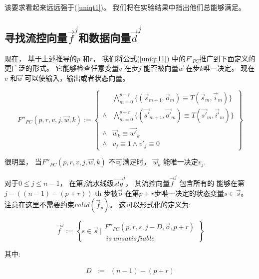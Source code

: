该要求看起来远远强于(\ref{uniqt1})。
我们将在实验结果中指出他们总能够满足。



\subsection{寻找流控向量$\vec{f}^j$和数据向量$\vec{d}^j$}\label{subsec_inferstage}

现在，
基于上述推导的$p$ 和$r$，
我们将公式(\ref{uniqt11}) 中的$F'_{PC}$推广到下面定义的更广泛的形式。
它能够检查任意变量$v$ 在步$j$
能否被向量$\vec{w}$ 在步$k$唯一决定。
现在$v$ 和$\vec{w}$ 可以使输入，输出或者状态向量。

\begin{equation}\label{uniqt2}
F''_{PC}(p,r,v,j,\vec{w},k):=
\left\{
\begin{array}{cc}
&\bigwedge_{m=0}^{p+r}
\{
(\vec{s}_{m+1},\vec{o}_m)\equiv T(\vec{s}_m,\vec{i}_m)
\}
\\
\wedge&\bigwedge_{m=0}^{p+r}
\{
(\vec{s'}_{m+1},\vec{o'}_m)\equiv T(\vec{s'}_m,\vec{i'}_m)
\}
\\
\wedge&\vec{w}_{k}\equiv \vec{w'}_{k} \\
\wedge& v_{j}\equiv 1 \wedge  v'_{j}\equiv 0
\end{array}
\right\}
\end{equation}

很明显，
当$F''_{PC}(p,r,v,j,\vec{w},k)$ 不可满足时，
$\vec{w}_k$ 能唯一决定$v_j$.

对于$0\le j\le n-1$，
在第$j$流水线级$\vec{stg}^j$，
其流控向量$\vec{f}^j$ 包含所有的
能够在第$j-((n-1)-(p+r))$-th 步被$\vec{o}$
在第$p+r$步唯一决定的状态变量$s\in \vec{s}$。
注意在这里不需要约束$valid(\vec{f}_p)$。
这可以形式化的定义为:

\begin{equation}\label{stgn_fj}
\vec{f}^{j} :=
 \left\{
 s\in \vec{s} ~|
\begin{array}{cc}
 F''_{PC}(p,r,s,j-D,\vec{o},p+r)\\
 ~is~unsatisfiable
\end{array}
\right\}
\end{equation}

其中:

\begin{equation}\label{stgn_def}
\begin{array}{ccc}
D             & := & (n-1)-(p+r)\\
\end{array}
\end{equation}

